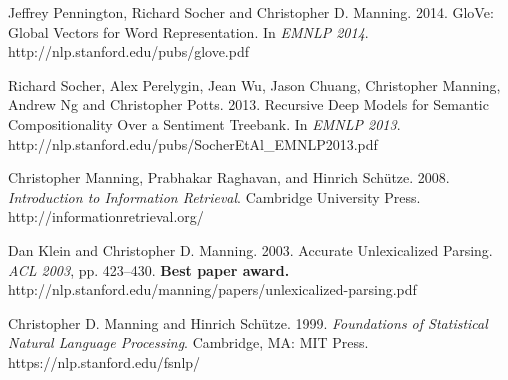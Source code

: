 \documentclass[11pt,letterpaper]{article}
\def\url#1{{\small\sf #1}}
\begin{document}
\begin{vita}
\begin{Products (most closely related)}
\end{Products (most closely related)}


\begin{Products (other significant)}


\item Jeffrey Pennington, Richard Socher and Christopher D. Manning. 2014.
GloVe: Global Vectors for Word Representation. In \emph{EMNLP 2014}. \url{http://nlp.stanford.edu/pubs/glove.pdf}

\item Richard Socher, Alex Perelygin, Jean Wu,  Jason Chuang,
  Christopher Manning, Andrew Ng and Christopher Potts. 2013.
Recursive Deep Models for Semantic Compositionality Over a Sentiment
Treebank. In \emph{EMNLP 2013}. \url{http://nlp.stanford.edu/pubs/SocherEtAl\_EMNLP2013.pdf}

\item Christopher Manning, Prabhakar Raghavan, and Hinrich Sch\"utze. 2008. \emph{Introduction to Information Retrieval}.  Cambridge University Press.
\url{http://informationretrieval.org/}

\item Dan Klein and Christopher D. Manning. 2003. Accurate Unlexicalized Parsing. \emph{ACL 2003}, pp. 423--430. \textbf{Best paper award.} \url{http://nlp.stanford.edu/\texttildelow manning/papers/unlexicalized-parsing.pdf}

\item Christopher D. Manning and Hinrich Sch\"utze. 1999. {\em Foundations
of Statistical Natural Language Processing}.  Cambridge, MA: MIT Press. \url{https://nlp.stanford.edu/fsnlp/}





\end{Products (other significant)}
\end{vita}
\end{document}

